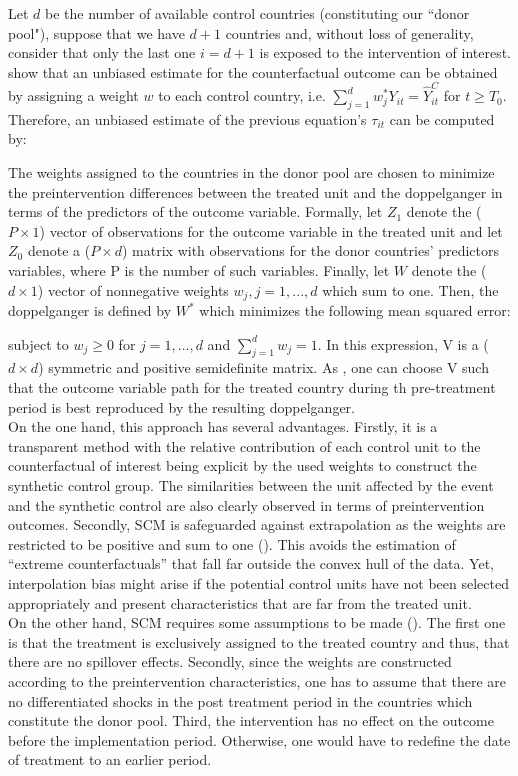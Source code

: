 \documentclass[11pt, a4paper, leqno]{article}
\begin{document}
Let $d$ be the number of available control countries (constituting our ``donor pool"), suppose that we have $d+1$ countries and, without loss of generality, consider that only the last one $i=d+1$ is exposed to the intervention of interest. \citet{Abadie2010} show that an unbiased estimate for the counterfactual outcome can be obtained by assigning a weight $w$ to each control country, i.e. $\sum_{j=1}^{d}w^*_j Y_{it} = \hat{Y}_{it}^C$ for $t \geq T_0$. Therefore, an unbiased estimate of the previous equation's $\tau_{it}$ can be computed by:

The weights assigned to the countries in the donor pool are chosen to minimize the preintervention differences between the treated unit and the doppelganger in terms of the predictors of the outcome variable. Formally, let $Z_1$ denote the ($P \times 1$) vector of observations for the outcome variable in the treated unit and let $Z_0$ denote a ($P \times d$) matrix with observations for the donor countries' predictors variables, where P is the number of such variables. Finally, let $W$ denote the ($d \times 1$) vector of nonnegative weights $w_j, j=1,...,d$ which sum to one. Then, the doppelganger is defined by $W^*$ which minimizes the following mean squared error:

subject to $w_j \geq 0$ for $j=1,...,d$ and $\sum_{j=1}^{d}w_j = 1$. In this expression, V is a ($d \times d$) symmetric and positive semidefinite matrix. As \citet{Abadie2003}, one can choose V such that the outcome variable path for the treated country during th pre-treatment period is best reproduced by the resulting doppelganger.\\

On the one hand, this approach has several advantages. Firstly, it is a transparent method with the relative contribution of each control unit to the counterfactual of interest being explicit by the used weights to construct the synthetic control group. The similarities between the unit affected by the  event and the synthetic control are also clearly observed in terms of preintervention outcomes. Secondly, SCM is safeguarded against extrapolation as the weights are restricted to be positive and sum to one (\citet{Abadie2010}). This avoids the estimation of ``extreme counterfactuals” that fall far outside the convex hull of the data. Yet, interpolation bias might arise if the potential control units have not been selected appropriately and present characteristics that are far from the treated unit. \\

On the other hand, SCM requires some assumptions to be made (\citet{Abadie2010}). The first one is that the treatment is exclusively assigned to the treated country and thus, that there are no spillover effects. Secondly, since the weights are constructed according to the preintervention characteristics, one has to assume that there are no differentiated shocks in the post treatment period in the countries which constitute the donor pool. Third, the intervention has no effect on the outcome before the implementation period. Otherwise, one would have to redefine the date of treatment to an earlier period. \\
\end{document}
